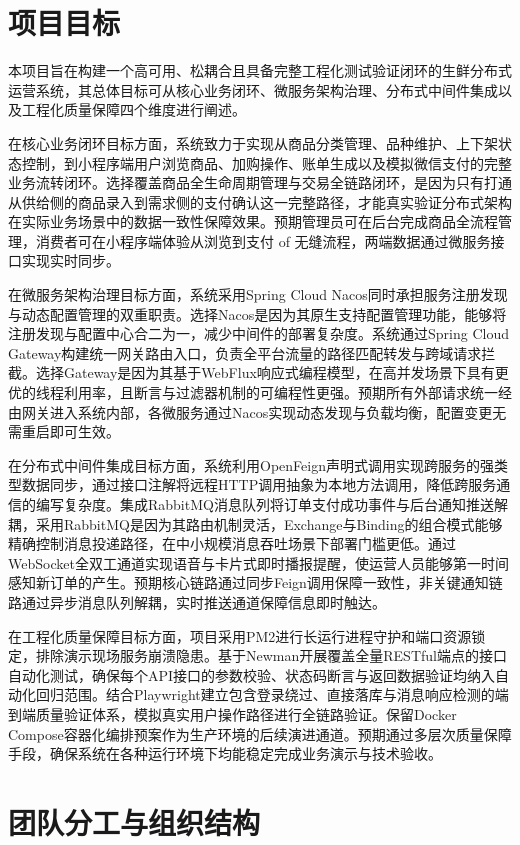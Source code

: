 \section{项目目标}

本项目旨在构建一个高可用、松耦合且具备完整工程化测试验证闭环的生鲜分布式运营系统，其总体目标可从核心业务闭环、微服务架构治理、分布式中间件集成以及工程化质量保障四个维度进行阐述。

在核心业务闭环目标方面，系统致力于实现从商品分类管理、品种维护、上下架状态控制，到小程序端用户浏览商品、加购操作、账单生成以及模拟微信支付的完整业务流转闭环。选择覆盖商品全生命周期管理与交易全链路闭环，是因为只有打通从供给侧的商品录入到需求侧的支付确认这一完整路径，才能真实验证分布式架构在实际业务场景中的数据一致性保障效果。预期管理员可在后台完成商品全流程管理，消费者可在小程序端体验从浏览到支付 of 无缝流程，两端数据通过微服务接口实现实时同步。

在微服务架构治理目标方面，系统采用Spring Cloud Nacos同时承担服务注册发现与动态配置管理的双重职责。选择Nacos是因为其原生支持配置管理功能，能够将注册发现与配置中心合二为一，减少中间件的部署复杂度。系统通过Spring Cloud Gateway构建统一网关路由入口，负责全平台流量的路径匹配转发与跨域请求拦截。选择Gateway是因为其基于WebFlux响应式编程模型，在高并发场景下具有更优的线程利用率，且断言与过滤器机制的可编程性更强。预期所有外部请求统一经由网关进入系统内部，各微服务通过Nacos实现动态发现与负载均衡，配置变更无需重启即可生效。

在分布式中间件集成目标方面，系统利用OpenFeign声明式调用实现跨服务的强类型数据同步，通过接口注解将远程HTTP调用抽象为本地方法调用，降低跨服务通信的编写复杂度。集成RabbitMQ消息队列将订单支付成功事件与后台通知推送解耦，采用RabbitMQ是因为其路由机制灵活，Exchange与Binding的组合模式能够精确控制消息投递路径，在中小规模消息吞吐场景下部署门槛更低。通过WebSocket全双工通道实现语音与卡片式即时播报提醒，使运营人员能够第一时间感知新订单的产生。预期核心链路通过同步Feign调用保障一致性，非关键通知链路通过异步消息队列解耦，实时推送通道保障信息即时触达。

在工程化质量保障目标方面，项目采用PM2进行长运行进程守护和端口资源锁定，排除演示现场服务崩溃隐患。基于Newman开展覆盖全量RESTful端点的接口自动化测试，确保每个API接口的参数校验、状态码断言与返回数据验证均纳入自动化回归范围。结合Playwright建立包含登录绕过、直接落库与消息响应检测的端到端质量验证体系，模拟真实用户操作路径进行全链路验证。保留Docker Compose容器化编排预案作为生产环境的后续演进通道。预期通过多层次质量保障手段，确保系统在各种运行环境下均能稳定完成业务演示与技术验收。

\section{团队分工与组织结构}

